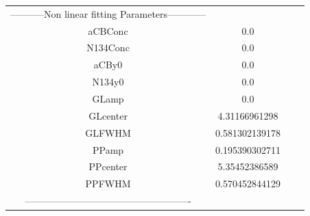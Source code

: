 \documentclass{article}
\begin{document}
\begin{tabular}{c c c c}

-----------Non linear fitting Parameters------------\\
aCBConc    &0.0\\
N134Conc   &0.0\\
aCBy0      &0.0\\
N134y0     &0.0\\
GLamp      &0.0\\
GLcenter   &4.31166961298\\
GLFWHM     &0.581302139178\\
PPamp      &0.195390302711\\
PPcenter   &5.35452386589\\
PPFWHM     &0.570452844129\\
----------------------------------------------------\\


\end{tabular}
\end{document}
